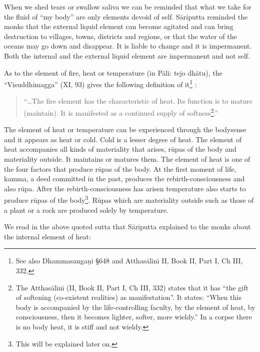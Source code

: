 \documentclass{book}
\begin{document}
When we shed tears or swallow saliva we can be reminded that what we
take for the fluid of ``my body'' are only elements devoid of self.
S{\=a}riputta reminded the monks that the external liquid element can
become agitated and can bring destruction to villages, towns, districts
and regions, or that the water of the oceans may go down and disappear.
It is liable to change and it is impermanent. Both the internal and the
external liquid element are impermanent and not self.

As to the element of fire, heat or temperature (in P{\=a}li: tejo
dh{\=a}tu), the ``Visuddhimagga'' (XI, 93) gives the following
definition of it\footnote{See also Dhamma\-sanga\d ni {\S}648 and
Atthas{\=a}lin\=\i{}  II, Book II, Part I, Ch III, 332.} :




\begin{quote}\begin{flushleft}
``\ldots The fire element has the characteristic of heat. Its function is to mature (maintain). It is manifested as a continued supply of softness\footnote{The Atthas{\=a}lin\=\i{}  (II, Book II, Part I, Ch III, 332)
states that it has ``the gift of softening (co-existent realities) as
manifestation''. It states: ``When this body is accompanied by the
life-controlling faculty, by the element of heat, by consciousness,
then it becomes lighter, softer, more wieldy.'' In a corpse there is
no body heat, it is stiff and not wieldy.}.''

\end{flushleft}\end{quote}



The element of heat or temperature can be experienced through the
bodysense and it appears as heat or cold. Cold is a lesser degree of
heat. The element of heat accompanies all kinds of materiality that
arises, r\=upas of the body and materiality outside. It maintains or
matures them. The element of heat is one of the four factors that
produce r\=upas of the body. At the first moment of life, kamma, a deed
committed in the past, produces the rebirth-consciousness and also
r\=upa. After the rebirth-consciousness has arisen temperature also
starts to produce r\=upas of the body\footnote{This will be
explained later on.}. R\=upas which are materiality outside such as
those of a plant or a rock are produced solely by temperature. 

We read in the above quoted sutta that S{\=a}riputta explained to the
monks about the internal element of heat:
\end{document}
